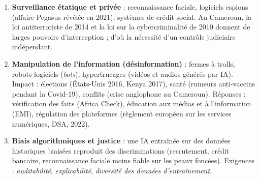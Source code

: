 \documentclass[11pt]{article}
\begin{document}
\begin{aretenir}
\begin{enumerate}
    \item \textbf{Surveillance étatique et privée} : reconnaissance faciale, logiciels espions (affaire Pegasus révélée en 2021), systèmes de crédit social. Au Cameroun, la loi antiterroriste de 2014 et la loi sur la cybercriminalité de 2010 donnent de larges pouvoirs d'interception ; d'où la nécessité d'un contrôle judiciaire indépendant.
    \item \textbf{Manipulation de l'information (désinformation)} : fermes à trolls, robots logiciels (\emph{bots}), hypertrucages (vidéos et audios générés par IA). Impact : élections (États-Unis 2016, Kenya 2017), santé (rumeurs anti-vaccins pendant la Covid-19), conflits (crise anglophone au Cameroun). Réponses : vérification des faits (Africa Check), éducation aux médias et à l'information (EMI), régulation des plateformes (règlement européen sur les services numériques, DSA, 2022).
    \item \textbf{Biais algorithmiques et justice} : une IA entraînée sur des données historiques biaisées reproduit des discriminations (recrutement, crédit bancaire, reconnaissance faciale moins fiable sur les peaux foncées). Exigences : \emph{auditabilité}, \emph{explicabilité}, \emph{diversité des données d'entraînement}.
\end{enumerate}
\end{aretenir}
\end{document}

